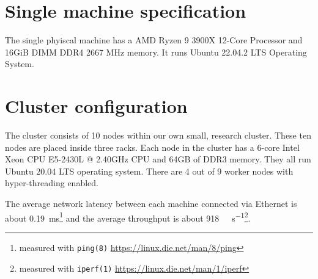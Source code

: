 \section{Single machine specification}

The single phyiscal machine has a AMD Ryzen 9 3900X 12-Core Processor and 16GiB 
DIMM DDR4 2667 MHz memory. It runs Ubuntu 22.04.2 LTS Operating System. 


\section{Cluster configuration}

The cluster consists of 10 nodes within our own small, research cluster. These
ten nodes are placed inside three racks.
Each node in the cluster has a 6-core Intel Xeon CPU E5-2430L @ 2.40GHz CPU 
and 64GB of DDR3 
memory. They all run Ubuntu 20.04 LTS operating system. There are 4 out of 9 
worker nodes with hyper-threading enabled.

The average network latency between
each machine connected via Ethernet is about 
\qty{0.19}{\milli\second}\footnote{measured with \texttt{ping(8)} \url{https://linux.die.net/man/8/ping}}
and the average throughput is about \qty{918}{\mega\bit\per\second}\footnote{
measured with \texttt{iperf(1)} \url{https://linux.die.net/man/1/iperf}}.

